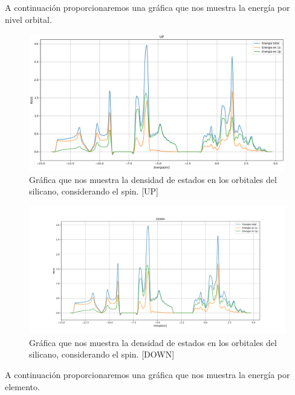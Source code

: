 A continuación proporcionaremos una gráfica que nos muestra la energía por nivel orbital.

\begin{figure}[H]
    \centering
    \includegraphics[scale=0.3]{images_silicano/Densidad_estados_con_spin_up_1s.png}
    \caption{Gráfica que nos muestra la densidad de estados en los orbitales del silicano, considerando el spin. [UP]}
\end{figure}

\begin{figure}[H]
    \centering
    \includegraphics[scale=0.38]{images_silicano/Densidad_estados_con_spin_down.png}
    \caption{Gráfica que nos muestra la densidad de estados en los orbitales del silicano, considerando el spin. [DOWN]}
\end{figure}

\vspace{0.5cm}

A continuación proporcionaremos una gráfica que nos muestra la energía por elemento.

